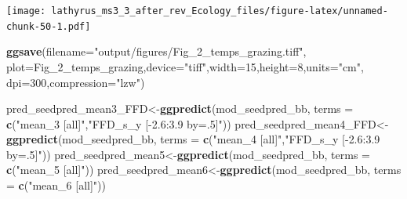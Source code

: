 \documentclass[
]{article}
\newenvironment{Shaded}{\begin{snugshade}}{\end{snugshade}}
\newcommand{\DataTypeTok}[1]{\textcolor[rgb]{0.13,0.29,0.53}{#1}}
\newcommand{\DecValTok}[1]{\textcolor[rgb]{0.00,0.00,0.81}{#1}}
\newcommand{\KeywordTok}[1]{\textcolor[rgb]{0.13,0.29,0.53}{\textbf{#1}}}
\newcommand{\NormalTok}[1]{#1}
\newcommand{\StringTok}[1]{\textcolor[rgb]{0.31,0.60,0.02}{#1}}
\begin{document}
\texttt{[image: lathyrus\_ms3\_3\_after\_rev\_Ecology\_files/figure-latex/unnamed-chunk-50-1.pdf]}

\begin{Shaded}
\begin{Highlighting}[]
\KeywordTok{ggsave}\NormalTok{(}\DataTypeTok{filename=}\StringTok{"output/figures/Fig\_2\_temps\_grazing.tiff"}\NormalTok{,}
       \DataTypeTok{plot=}\NormalTok{Fig\_}\DecValTok{2}\NormalTok{\_temps\_grazing,}\DataTypeTok{device=}\StringTok{"tiff"}\NormalTok{,}\DataTypeTok{width=}\DecValTok{15}\NormalTok{,}\DataTypeTok{height=}\DecValTok{8}\NormalTok{,}\DataTypeTok{units=}\StringTok{"cm"}\NormalTok{,}
       \DataTypeTok{dpi=}\DecValTok{300}\NormalTok{,}\DataTypeTok{compression=}\StringTok{"lzw"}\NormalTok{)}
\end{Highlighting}
\end{Shaded}

\begin{Shaded}
\begin{Highlighting}[]
\NormalTok{pred\_seedpred\_mean3\_FFD\textless{}{-}}\KeywordTok{ggpredict}\NormalTok{(mod\_seedpred\_bb,}
                        \DataTypeTok{terms =} \KeywordTok{c}\NormalTok{(}\StringTok{"mean\_3 [all]"}\NormalTok{,}\StringTok{"FFD\_s\_y [{-}2.6:3.9 by=.5]"}\NormalTok{))}
\NormalTok{pred\_seedpred\_mean4\_FFD\textless{}{-}}\KeywordTok{ggpredict}\NormalTok{(mod\_seedpred\_bb,}
                        \DataTypeTok{terms =} \KeywordTok{c}\NormalTok{(}\StringTok{"mean\_4 [all]"}\NormalTok{,}\StringTok{"FFD\_s\_y [{-}2.6:3.9 by=.5]"}\NormalTok{))}
\NormalTok{pred\_seedpred\_mean5\textless{}{-}}\KeywordTok{ggpredict}\NormalTok{(mod\_seedpred\_bb,}
                              \DataTypeTok{terms =} \KeywordTok{c}\NormalTok{(}\StringTok{"mean\_5 [all]"}\NormalTok{))}
\NormalTok{pred\_seedpred\_mean6\textless{}{-}}\KeywordTok{ggpredict}\NormalTok{(mod\_seedpred\_bb,}
                              \DataTypeTok{terms =} \KeywordTok{c}\NormalTok{(}\StringTok{"mean\_6 [all]"}\NormalTok{))}
\end{Highlighting}
\end{Shaded}
\end{document}
